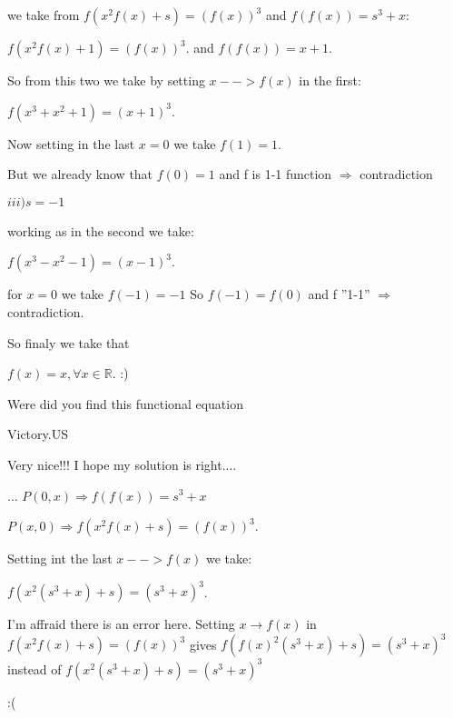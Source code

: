 \begin{solution}
we take from $ f(x^2f(x) + s) = (f(x))^3$ and $ f(f(x)) = s^3 + x:$

$ f(x^2f(x) + 1) = (f(x))^3$. and $ f(f(x)) = x + 1$.

So from this two we take by setting $ x - - > f(x)$ in the first:

$ f(x^3 + x^2 + 1) = (x + 1)^3$.

Now setting in the last $ x = 0$ we take $ f(1) = 1$.

But we already know that $ f(0) = 1$ and f is 1-1 function $ \Longrightarrow$ contradiction

$ iii)s = - 1$

working as in the second we take:

$ f(x^3 - x^2 - 1) = (x - 1)^3$.

for $ x = 0$ we take $ f( - 1) = - 1$ 
So $ f( - 1) = f(0)$ and f ''1-1'' $ \Longrightarrow$ contradiction.

So finaly we take that 

$ \boxed{f(x) = x},\forall x\in \mathbb{R}$.
 :)

Were did you find this functional equation \begin{bolded}Victory.US\end{bolded}
\end{solution}



\begin{solution}
	\begin{tcolorbox}Very nice!!!
I hope my solution is right....


...
$ P(0,x) \Longrightarrow f(f(x)) = s^3 + x$

$ P(x,0) \Longrightarrow f(x^2f(x) + s) = (f(x))^3$.

Setting int the last $ x - - > f(x)$ we take:

$ f(x^2(s^3 + x) + s) = (s^3 + x)^3$.

\end{tcolorbox}

I'm affraid there is an error here.
Setting $ x\to f(x)$ in $ f(x^2f(x) + s) = (f(x))^3$ gives $ f(f(x)^2(s^3 + x) + s) = (s^3 + x)^3$ instead of $ f(x^2(s^3 + x) + s) = (s^3 + x)^3$

:(
\end{solution}




